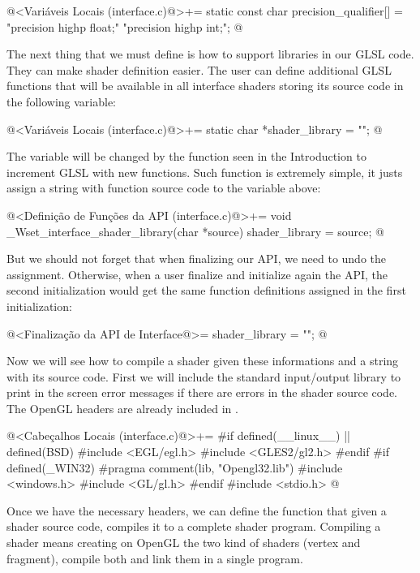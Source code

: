 \iniciocodigo
@<Variáveis Locais (interface.c)@>+=
static const char precision_qualifier[] = "precision highp float;\n"
                                          "precision highp int;\n";
@
\fimcodigo

The next thing that we must define is how to support libraries in our
GLSL code. They can make shader definition easier. The user can
define additional GLSL functions that will be available in all
interface shaders storing its source code in the following variable:

\iniciocodigo
@<Variáveis Locais (interface.c)@>+=
static char *shader_library = "";
@
\fimcodigo

The variable will be changed by the function seen in the Introduction
to increment GLSL with new functions. Such function is extremely
simple, it justs assign a string with function source code to the
variable above:

\iniciocodigo
@<Definição de Funções da API (interface.c)@>+=
void _Wset_interface_shader_library(char *source){
  shader_library = source;
}
@
\fimcodigo

But we should not forget that when finalizing our API, we need to undo
the assignment. Otherwise, when a user finalize and initialize again
the API, the second initialization would get the same function
definitions assigned in the first initialization:

\iniciocodigo
@<Finalização da API de Interface@>=
shader_library = "";
@
\fimcodigo

Now we will see how to compile a shader given these informations and a
string with its source code. First we will include the standard
input/output library to print in the screen error messages if there
are errors in the shader source code. The OpenGL headers are already
included in .

\iniciocodigo
@<Cabeçalhos Locais (interface.c)@>+=
#if defined(__linux__) || defined(BSD)
#include <EGL/egl.h>
#include <GLES2/gl2.h>
#endif
#if defined(_WIN32)
#pragma comment(lib, "Opengl32.lib")
#include <windows.h>
#include <GL/gl.h>
#endif
#include <stdio.h>
@
\fimcodigo

Once we have the necessary headers, we can define the function that
given a shader source code, compiles it to a complete shader
program. Compiling a shader means creating on OpenGL the two kind of
shaders (vertex and fragment), compile both and link them in a
single program.

